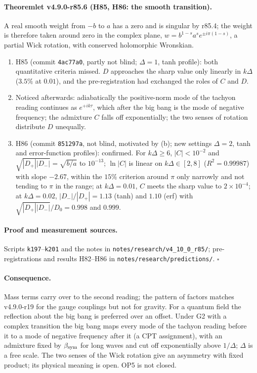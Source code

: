 \paragraph{Theoremlet v4.9.0-r85.6 (H85, H86: the smooth transition).}
A real smooth weight from \(-b\) to \(a\) has a zero and is singular by r85.4; the weight is therefore taken around zero in the complex
plane, \(w=b^{1-s}a^se^{\pm i\pi(1-s)}\), a partial Wick rotation, with conserved holomorphic Wronskian.
\begin{enumerate}[leftmargin=2em]
\item[(a)] H85 (commit \texttt{4ac77a0}, partly not blind; \(\Delta=1\), tanh profile): both quantitative criteria missed.  \(D\) approaches the
sharp value only linearly in \(k\Delta\) (\(3.5\%\) at \(0.01\)), and the pre-registration had exchanged the roles of \(C\) and \(D\).
\item[(b)] Noticed afterwards: adiabatically the positive-norm mode of the tachyon reading continues as \(e^{+ik\tau}\), which after the big bang
is the mode of negative frequency; the admixture \(C\) falls off exponentially; the two senses of rotation distribute \(D\) unequally.
\item[(c)] H86 (commit \texttt{851297a}, not blind, motivated by (b); new settings \(\Delta=2\), tanh and error-function profiles): confirmed.
For \(k\Delta\ge6\), \(|C|<10^{-2}\) and \(\sqrt{|D_+||D_-|}=\sqrt{b/a}\) to \(10^{-13}\); \(\ln|C|\) is linear on \(k\Delta\in[2,8]\) (\(R^2=0.99987\)) with slope
\(-2.67\), within the \(15\%\) criterion around \(\pi\) only narrowly and not tending to \(\pi\) in the range; at \(k\Delta=0.01\), \(C\) meets the sharp
value to \(2\times10^{-4}\); at \(k\Delta=0.02\), \(|D_-|/|D_+|=1.13\) (tanh) and \(1.10\) (erf) with \(\sqrt{|D_+||D_-|}/D_0=0.998\) and \(0.999\).
\end{enumerate}

\paragraph{Proof and measurement sources.}
Scripts \texttt{k197}--\texttt{k201} and the notes in \texttt{notes/\allowbreak research/\allowbreak v4\_10\_0\_r85/}; pre-registrations and results
H82--H86 in \texttt{notes/\allowbreak research/\allowbreak predictions/}.  \(\square\)

\paragraph{Consequence.}
Mass terms carry over to the second reading; the pattern of factors matches v4.9.0-r19 for the gauge couplings but not for gravity.
For a quantum field the reflection about the big bang is preferred over an offset.  Under G2 with a complex transition the big bang maps
every mode of the tachyon reading before it to a mode of negative frequency after it (a CPT assignment), with an admixture fixed by
\(\beta_{\mathrm{sym}}\) for long waves and cut off exponentially above \(1/\Delta\); \(\Delta\) is a free scale.  The two senses of the Wick rotation give an
asymmetry with fixed product; its physical meaning is open.  OP5 is not closed.

